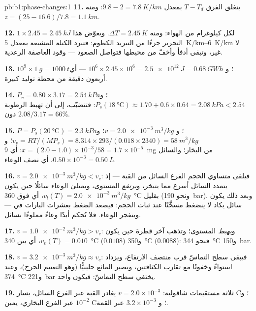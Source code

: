 \begin{solution}{pb:b1:phase-changes:1}
\textbf{11.} ينغلق الفرق $T - T_d$ بمعدل $9.8 - 2 = \qty{7.8}{K/km}$: ومنه $z = (25 - 16.6)/
7.8 = \qty{1.1}{km}$.

\textbf{12.} $1 \times 2.45 = \qty{2.45}{kJ}$ لكل كيلوغرام من الهواء: ومنه $\Delta T =
\qty{2.45}{K}$. ويعوّض هذا التحرير جزءًا من التبريد الكظوم: فتبرد
الكتلة المشبعة بمعدل \qtyrange{5}{6}{K/km} لا غير، وتبقى أدفأ
وأخفّ من محيطها فتواصل الصعود --- 
وقود العاصفة الرعدية.

\textbf{13.} $10^9 \times \qty{1}{g} = \qty{1000}{t}$؛ و $10^6 \times 2.45 \times 10^6 =
\qty{2.5e12}{J} = \qty{0.68}{GW h}$ --- أي أربعون دقيقة من محطة توليد كبيرة.

\textbf{14.} $P_v = 0.80 \times 3.17 = \qty{2.54}{kPa}$؛ و $P_s(\qty{18}{\degreeCelsius})
\approx 1.70 + 0.6 \times 0.64 = \qty{2.08}{kPa} < 2.54$: فتتضبّب، إلى أن تهبط
الرطوبة دون $2.08/3.17 = 66\%$.

\textbf{15.} $P = P_s(\qty{20}{\degreeCelsius}) = \qty{2.3}{kPa}$؛ و $v = \qty{2.0e-3}{m^3/kg}$؛
و $v_v = RT/(MP_s) = 8.314 \times 293/(0.018 \times 2340) = \qty{58}{m^3/kg}$؛ و $x =
(2.0 - 1.0) \times 10^{-3}/58 = 1.7 \times 10^{-5}$: أي \qty{9}{mg} من البخار؛
والسائل $0.50 \times 10^{-3} = \qty{0.50}{L}$، أي نصف الوعاء.

\textbf{16.} $v = \qty{2.0e-3}{m^3/kg} < v_c$: فيلقى متساوي الحجم الفرع
السائل من القبة --- إذ يتمدد السائل أسرع مما يتبخر، و\emph{يرتفع}
المستوى، ويمتلئ الوعاء سائلًا حين يكون $v_l(T) =
\qty{2.0e-3}{m^3/kg}$، أي فوق \qty{360}{\degreeCelsius} بقليل (ونحو
\qty{190}{bar}). وبعد ذلك يكون سائل يكاد لا ينضغط مسخَّنًا عند ثبات
الحجم: فيصعد الضغط بعشرات البارات في  --- وينفجر الوعاء.
فلا تُحكم أبدًا وعاءً مملوءًا بسائل.

\textbf{17.} $v = \qty{1.0e-2}{m^3/kg} > v_c$: و\emph{يهبط} المستوى؛ وتذهب آخر
قطرة حين يكون $v_v(T) = 0.010$، أي بين \qty{340}{\degreeCelsius} ($0.0108$)
و\qty{350}{\degreeCelsius} ($0.0088$): فنحو \qty{344}{\degreeCelsius}
و\qty{150}{bar}.

\textbf{18.} $v = \qty{3.2e-3}{m^3/kg} \approx v_c$: فيبقى سطح التماسّ قرب
منتصف الارتفاع، ويزداد استواءً وخفوتًا مع تقارب الكثافتين،
ويصير المائع حليبيًّا (وهو التعتيم الحرج)، وعند \qty{374}{\degreeCelsius}
و\qty{221}{bar} يختفي سطح التماسّ: فيكون  واحد.

\textbf{19.} ثلاثة مستقيمات شاقولية: $v = 2.0 \times 10^{-3}$ يغادر القبة
عبر الفرع السائل، يسار C؛ و $10^{-2}$ عبر الفرع البخاري،
يمين C؛ و $3.2 \times 10^{-3}$ عبر القمة.


\end{solution}
